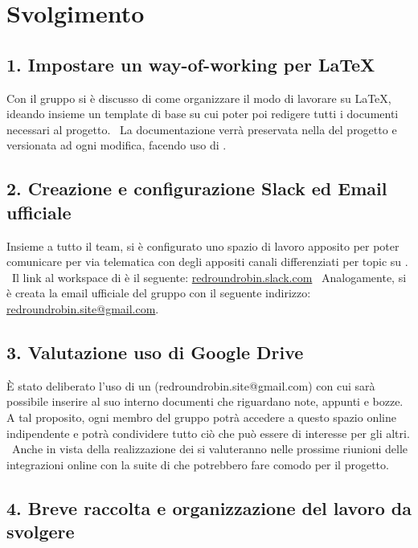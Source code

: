 \newpage
\section*{Svolgimento}

\subsection*{1. Impostare un way-of-working per \LaTeX{} }

Con il gruppo si è discusso di come organizzare il modo di lavorare su \LaTeX{}, ideando insieme un template di base su cui poter poi redigere tutti i documenti necessari al progetto. \
La documentazione verrà preservata nella  del progetto e versionata ad ogni modifica, facendo uso di .

\subsection*{2. Creazione e configurazione Slack ed Email ufficiale}

Insieme a tutto il team, si è configurato uno spazio di lavoro apposito per poter comunicare per via telematica con degli appositi canali differenziati per topic su . \
Il link al workspace di  è il seguente: \href{http://redroundrobin.slack.com}{redroundrobin.slack.com} \
Analogamente, si è creata la email ufficiale del gruppo con il seguente indirizzo:
\href{mailto:redroundrobin.site@gmail.com}{redroundrobin.site@gmail.com}.


\subsection*{3. Valutazione uso di Google Drive}

È stato deliberato l'uso di un  (redroundrobin.site@gmail.com) con cui sarà possibile inserire al suo interno documenti che riguardano note, appunti e bozze. A tal proposito, ogni membro del gruppo potrà accedere a questo spazio online indipendente e potrà condividere tutto ciò che può essere di interesse per gli altri. \
Anche in vista della realizzazione dei  si valuteranno nelle prossime riunioni delle integrazioni online con la suite di  che potrebbero fare comodo per il progetto.


\subsection*{4. Breve raccolta e organizzazione del lavoro da svolgere}


